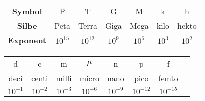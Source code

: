     \begin{tabular}{c c c c c c c}
        \textbf{Symbol}     & P         & T         & G         & M         & k         & h   \\
        \textbf{Silbe}      & Peta      & Terra     & Giga      & Mega      & kilo      & hekto \\
        \textbf{Exponent}   & $10^{15}$ & $10^{12}$ & $10^9$    & $10^6$    & $10^3$    & $10^2$
    \end{tabular}
    \begin{tabular}{c c c c c c c c}
        d         & c         & m         & $\mu$         & n         & p           & f \\
        deci      & centi     & milli     & micro         & nano      & pico        & femto \\
        $10^{-1}$ & $10^{-2}$ & $10^{-3}$ & $10^{-6}$     & $10^{-9}$ & $10^{-12}$  & $10^{-15}$
    \end{tabular}